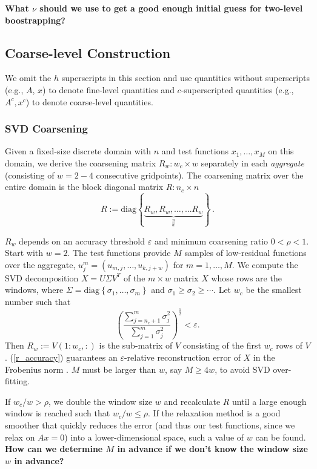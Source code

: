 \documentclass{article}
\begin{document}
{\bf What $\nu$ should we use to get a good enough initial guess for two-level boostrapping?}

\subsection{Coarse-level Construction}
We omit the $h$ superscripts in this section and use quantities without superscripts (e.g., $A$, $x$) to denote fine-level quantities and $c$-superscripted quantities (e.g., $A^c, x^c$) to denote coarse-level quantities.

\subsubsection{SVD Coarsening}
\label{svd_coarsening}
Given a fixed-size discrete domain with $n$ and test functions $x_1,\dots,x_M$ on this domain, we derive the coarsening matrix $R_w: w_c \times w$ separately in each \emph{aggregate} (consisting of $w = 2-4$ consecutive gridpoints). The coarsening matrix over the entire domain is the block diagonal matrix $R: n_c \times n$
\begin{equation}
	R := \text{diag} \left\{ \underbrace{R_w, R_w, \dots, ... R_w }_{\frac{n}{w}}  \right\} \,.
\end{equation}

$R_w$ depends on an accuracy threshold $\varepsilon$ and minimum coarsening ratio $0 < \rho < 1$. Start with $w = 2$. The test functions provide $M$ samples of low-residual functions over the aggregate, $u^m_j= (u_{m,j},\dots,u_{k,j+w})$ for $m = 1,\dots,M$. We compute the SVD decomposition $X = U \Sigma V^T$ of the $m \times w$ matrix $X$ whose rows are the windows, where $\Sigma = \text{diag}\left\{\sigma_1, \dots, \sigma_m \right\}$ and $\sigma_1 \geq \sigma_2 \geq \cdots$. Let $w_c$ be the smallest number such that
\begin{equation}
	\left(\frac{\sum_{j=n_c+1}^m \sigma_j^2}{\sum_{j=1}^m \sigma_j^2 } \right)^{\frac12} < \varepsilon.
	\label{r_accuracy}
\end{equation}
Then $R_w := V(1:w_c,:)$ is the sub-matrix of $V$ consisting of the first $w_c$ rows of $V$. (\ref{r_accuracy}) guarantees an $\varepsilon$-relative reconstruction error of $X$ in the Frobenius norm \cite{svd}. $M$ must be larger than $w$, say $M \geq 4 w$, to avoid SVD over-fitting.

If $w_c/w > \rho$, we double the window size $w$ and recalculate $R$ until a large enough window is reached such that $w_c/w \leq \rho$. If the relaxation method is a good smoother that quickly reduces the error (and thus our test functions, since we relax on $A x = 0$) into a lower-dimensional space, such a value of $w$ can be found.  {\bf How can we determine $M$ in advance if we don't know the window size $w$ in advance?}
\end{document}
